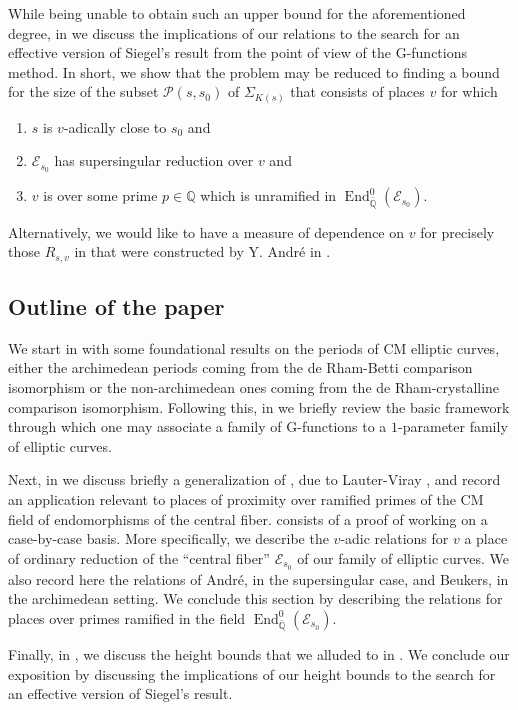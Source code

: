 \documentclass[12pt,twoside,a4paper]{article}
\theoremstyle{plain}%
\DeclareMathOperator{\End}{End}
\newcommand{\Q}{\mathbb{Q}}
\newcommand{\CE}{\mathcal{E}}
\newcommand{\CP}{\mathcal{P}}
\begin{document}
While being unable to obtain such an upper bound for the aforementioned degree, in  we discuss the implications of our relations to the search for an effective version of Siegel's result from the point of view of the G-functions method. In short, we show that the problem may be reduced to finding a bound for the size of the subset $\CP(s,s_0)$ of $\Sigma_{K(s)}$ that consists of places $v$ for which 
\begin{enumerate}
\item $s$ is $v$-adically close to $s_0$ and 
\item $\CE_{s_0}$ has supersingular reduction over $v$ and 
\item $v$ is over some prime $p\in \Q$ which is unramified in $\End^{0}_{\bar{\Q}}(\CE_{s_0})$. 
\end{enumerate}
Alternatively, we would like to have a measure of dependence on $v$ for precisely those $R_{s,v}$ in  that were constructed by Y. Andr\'e in \cite{andremots}.
\subsection{Outline of the paper}
We start in  with some foundational results on the periods of CM elliptic curves, either the archimedean periods coming from the de Rham-Betti comparison isomorphism or the non-archimedean ones coming from the de Rham-crystalline comparison isomorphism. Following this, in  we briefly review the basic framework through which one may associate a family of G-functions to a $1$-parameter family of elliptic curves. 

Next, in  we discuss briefly a generalization of \cite{grosszagier}, due to Lauter-Viray \cite{lauterviray}, and record an application relevant to places of proximity over ramified primes of the CM field of endomorphisms of the central fiber.  consists of a proof of  working on a case-by-case basis. More specifically, we describe the $v$-adic relations for $v$ a place of ordinary reduction of the ``central fiber'' $\CE_{s_0}$ of our family of elliptic curves. We also record here the relations of Andr\'e, in the supersingular case, and Beukers, in the archimedean setting. We conclude this section by describing the relations for places over primes ramified in the field $\End^{0}_{\bar{\Q}}(\CE_{s_0})$.

Finally, in , we discuss the height bounds that we alluded to in . We conclude our exposition by discussing the implications of our height bounds to the search for an effective version of Siegel's result.
\end{document}
